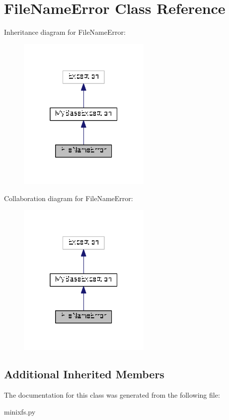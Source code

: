 \hypertarget{classminixfs_1_1_file_name_error}{}\section{File\+Name\+Error Class Reference}
\label{classminixfs_1_1_file_name_error}


Inheritance diagram for File\+Name\+Error\+:
\nopagebreak
\begin{figure}[H]
\begin{center}
\leavevmode
\includegraphics[width=181pt]{classminixfs_1_1_file_name_error__inherit__graph}
\end{center}
\end{figure}


Collaboration diagram for File\+Name\+Error\+:
\nopagebreak
\begin{figure}[H]
\begin{center}
\leavevmode
\includegraphics[width=181pt]{classminixfs_1_1_file_name_error__coll__graph}
\end{center}
\end{figure}
\subsection*{Additional Inherited Members}


The documentation for this class was generated from the following file\+:\begin{DoxyCompactItemize}
\item 
minixfs.\+py\end{DoxyCompactItemize}
